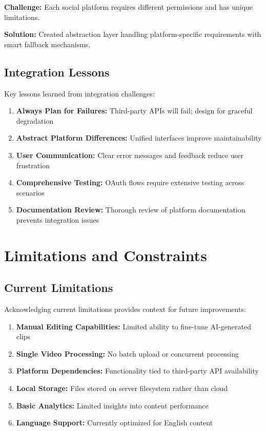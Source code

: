 \textbf{Challenge:} Each social platform requires different permissions and has unique limitations.

\textbf{Solution:} Created abstraction layer handling platform-specific requirements with smart fallback mechanisms.

\subsection{Integration Lessons}

Key lessons learned from integration challenges:

\begin{enumerate}
    \item \textbf{Always Plan for Failures:} Third-party APIs will fail; design for graceful degradation
    \item \textbf{Abstract Platform Differences:} Unified interfaces improve maintainability
    \item \textbf{User Communication:} Clear error messages and feedback reduce user frustration
    \item \textbf{Comprehensive Testing:} OAuth flows require extensive testing across scenarios
    \item \textbf{Documentation Review:} Thorough review of platform documentation prevents integration issues
\end{enumerate}

\section{Limitations and Constraints}

\subsection{Current Limitations}

Acknowledging current limitations provides context for future improvements:

\begin{enumerate}
    \item \textbf{Manual Editing Capabilities:} Limited ability to fine-tune AI-generated clips
    \item \textbf{Single Video Processing:} No batch upload or concurrent processing
    \item \textbf{Platform Dependencies:} Functionality tied to third-party API availability
    \item \textbf{Local Storage:} Files stored on server filesystem rather than cloud
    \item \textbf{Basic Analytics:} Limited insights into content performance
    \item \textbf{Language Support:} Currently optimized for English content
\end{enumerate}

